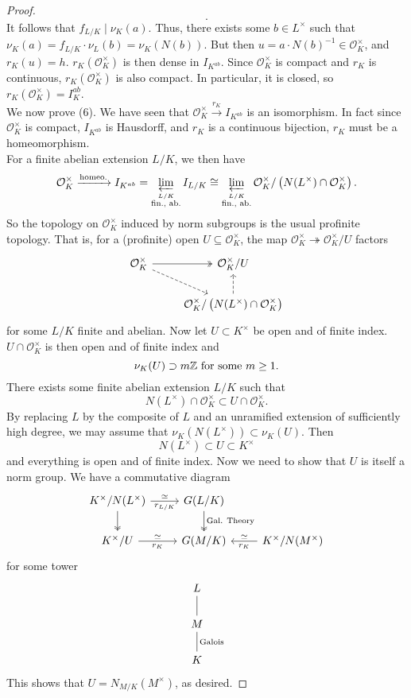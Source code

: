\begin{proof}
\[	.\] 
	It follows that $f_{L/K}\mid\nu_K(a)$. Thus, there exists some $b\in L^{\times}$ such that $\nu_K(a)=f_{L/K}\cdot\nu_L(b)=\nu_K(N(b))$. But then $u=a\cdot N(b)^{-1}\in\mathcal{O}_K^{\times}$, and $r_K(u)=h$. $r_K(\mathcal{O}_K^{\times})$ is then dense in $I_{K^{ab}}$. Since $\mathcal{O}_K^{\times}$ is compact and $r_K$ is continuous, $r_K(\mathcal{O}_K^{\times})$ is also compact. In particular, it is closed, so $r_K(\mathcal{O}_K^{\times})=I_K^{ab}$.\\
	We now prove (6). We have seen that $\mathcal{O}_K^{\times}\xrightarrow{r_K}I_{K^{ab}}$ is an isomorphism. In fact since $\mathcal{O}_K^{\times}$  is compact, $I_{K^{ab}}$ is Hausdorff, and $r_K$ is a continuous bijection, $r_K$ must be a homeomorphism.\\
	For a finite abelian extension $L/K$, we then have
	\[
		\mathcal{O}_K^{\times}\xrightarrow{\text{homeo.}}I_{K^{ab}}=\varprojlim_{\stackrel{L/K}{\text{fin., ab.}}}I_{L/K}\cong\varprojlim_{\stackrel{L/K}{\text{fin., ab.}}}\mathcal{O}_K^{\times}/\left(N(L^{\times})\cap\mathcal{O}_K^{\times}\right)
	.\] 
	So the topology on $\mathcal{O}_K^{\times}$ induced by norm subgroups is the usual profinite topology. That is, for a (profinite) open $U\subseteq\mathcal{O}_K^{\times}$, the map $\mathcal{O}_K^{\times}\twoheadrightarrow\mathcal{O}_K^{\times}/U$ factors
	\[
	\begin{tikzcd}
		\mathcal{O}_K^{\times}\ar[r,two heads]\ar[dr,dashed] & \mathcal{O}_K^{\times}/U\\
								   & \mathcal{O}_K^{\times}/\left(N(L^{\times})\cap\mathcal{O}_K^{\times}\right)\ar[u,dashed]
	\end{tikzcd}
	\] 
	for some $L/K$ finite and abelian. Now let $U\subset K^{\times}$ be open and of finite index. $U\cap\mathcal{O}_K^{\times}$ is then open and of finite index and
	\[
		\nu_K(U)\supset m\mathbb{Z}\text{ for some } m\ge 1
	.\] 
	There exists some finite abelian extension $L/K$ such that 
	\[
		N(L^{\times})\cap\mathcal{O}_K^{\times}\subset U\cap\mathcal{O}_K^{\times}
	.\] 
	By replacing $L$ by the composite of $L$ and an unramified extension of sufficiently high degree, we may assume that $\nu_K(N(L^{\times}))\subset\nu_K(U)$. Then
	\[
		N(L^{\times})\subset U\subset K^{\times}
	\] 
	and everything is open and of finite index. Now we need to show that $U$ is itself a norm group. We have a commutative diagram
	\[
	\begin{tikzcd}
		K^{\times}/N(L^{\times})\ar[r,"\simeq","r_{L/K}"']\ar[d,two heads] & G(L/K)\ar[d, two heads, "\text{Gal. Theory}"]\\
		K^{\times}/U\ar[r,"\simeq","r_K"'] & G(M/K) & K^{\times}/N(M^{\times})\ar[l,"r_K","\simeq"']
	\end{tikzcd}
	\] 
	for some tower
	\[
	\begin{tikzcd}
		L\ar[d,-]\\
		M\ar[d,-,"\text{Galois}"]\\
		K
	\end{tikzcd}
	\] 
	This shows that $U=N_{M/K}(M^{\times})$, as desired.
\end{proof}


